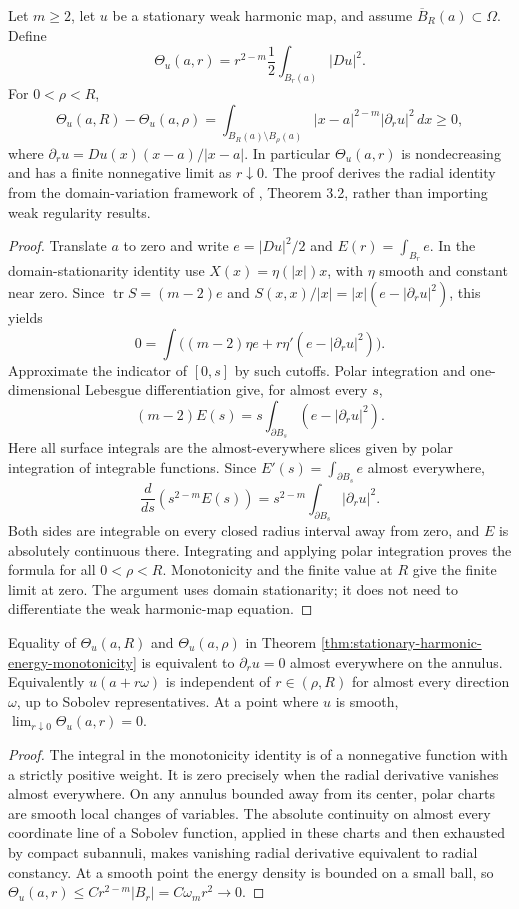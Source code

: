 \begin{theorem}\label{thm:stationary-harmonic-energy-monotonicity}
Let $m\ge2$, let $u$ be a stationary weak harmonic map, and assume $\overline B_R(a)\subset\Omega$. Define
\[
 \Theta_u(a,r)=r^{2-m}\frac12\int_{B_r(a)}|Du|^2.
\]
For $0<\rho<R$,
\[
 \Theta_u(a,R)-\Theta_u(a,\rho)
 =\int_{B_R(a)\setminus B_\rho(a)}|x-a|^{2-m}|\partial_r u|^2\,dx\ge0,
\]
where $\partial_r u=Du(x)(x-a)/|x-a|$. In particular $\Theta_u(a,r)$ is nondecreasing and has a finite nonnegative limit as $r\downarrow0$. The proof derives the radial identity from the domain-variation framework of \cite{Hel01}, Theorem 3.2, rather than importing weak regularity results.
\end{theorem}
\begin{proof}
Translate $a$ to zero and write $e=|Du|^2/2$ and $E(r)=\int_{B_r}e$. In the domain-stationarity identity use $X(x)=\eta(|x|)x$, with $\eta$ smooth and constant near zero. Since $\operatorname{tr}S=(m-2)e$ and $S(x,x)/|x|=|x|(e-|\partial_ru|^2)$, this yields
\[
 0=\int\big((m-2)\eta e+r\eta'(e-|\partial_ru|^2)\big).
\]
Approximate the indicator of $[0,s]$ by such cutoffs. Polar integration and one-dimensional Lebesgue differentiation give, for almost every $s$,
\[
 (m-2)E(s)=s\int_{\partial B_s}(e-|\partial_ru|^2).
\]
Here all surface integrals are the almost-everywhere slices given by polar integration of integrable functions. Since $E'(s)=\int_{\partial B_s}e$ almost everywhere,
\[
 \frac{d}{ds}(s^{2-m}E(s))=s^{2-m}\int_{\partial B_s}|\partial_ru|^2.
\]
Both sides are integrable on every closed radius interval away from zero, and $E$ is absolutely continuous there. Integrating and applying polar integration proves the formula for all $0<\rho<R$. Monotonicity and the finite value at $R$ give the finite limit at zero. The argument uses domain stationarity; it does not need to differentiate the weak harmonic-map equation.
\end{proof}

\begin{proposition}\label{prop:harmonic-energy-equality}
Equality of $\Theta_u(a,R)$ and $\Theta_u(a,\rho)$ in Theorem \ref{thm:stationary-harmonic-energy-monotonicity} is equivalent to $\partial_ru=0$ almost everywhere on the annulus. Equivalently $u(a+r\omega)$ is independent of $r\in(\rho,R)$ for almost every direction $\omega$, up to Sobolev representatives. At a point where $u$ is smooth, $\lim_{r\downarrow0}\Theta_u(a,r)=0$.
\end{proposition}
\begin{proof}
The integral in the monotonicity identity is of a nonnegative function with a strictly positive weight. It is zero precisely when the radial derivative vanishes almost everywhere. On any annulus bounded away from its center, polar charts are smooth local changes of variables. The absolute continuity on almost every coordinate line of a Sobolev function, applied in these charts and then exhausted by compact subannuli, makes vanishing radial derivative equivalent to radial constancy. At a smooth point the energy density is bounded on a small ball, so $\Theta_u(a,r)\le Cr^{2-m}|B_r|=C\omega_m r^2\to0$.
\end{proof}

